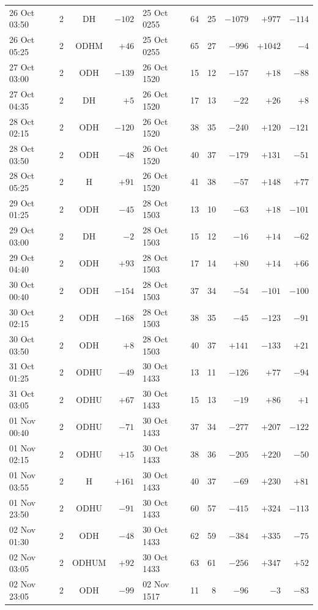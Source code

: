 \begin{tabular}{llcrlrrrrr}
26 Oct 03:50 & 2 & DH & $-102$ & 25 Oct 0255 & 64 & 25 & $-1079$ & $+977$ & $-114$ \\
26 Oct 05:25 & 2 & ODHM & $+46$ & 25 Oct 0255 & 65 & 27 & $-996$ & $+1042$ & $-4$ \\
27 Oct 03:00 & 2 & ODH & $-139$ & 26 Oct 1520 & 15 & 12 & $-157$ & $+18$ & $-88$ \\
27 Oct 04:35 & 2 & DH & $+5$ & 26 Oct 1520 & 17 & 13 & $-22$ & $+26$ & $+8$ \\
28 Oct 02:15 & 2 & ODH & $-120$ & 26 Oct 1520 & 38 & 35 & $-240$ & $+120$ & $-121$ \\
28 Oct 03:50 & 2 & ODH & $-48$ & 26 Oct 1520 & 40 & 37 & $-179$ & $+131$ & $-51$ \\
28 Oct 05:25 & 2 & H & $+91$ & 26 Oct 1520 & 41 & 38 & $-57$ & $+148$ & $+77$ \\
29 Oct 01:25 & 2 & ODH & $-45$ & 28 Oct 1503 & 13 & 10 & $-63$ & $+18$ & $-101$ \\
29 Oct 03:00 & 2 & DH & $-2$ & 28 Oct 1503 & 15 & 12 & $-16$ & $+14$ & $-62$ \\
29 Oct 04:40 & 2 & ODH & $+93$ & 28 Oct 1503 & 17 & 14 & $+80$ & $+14$ & $+66$ \\
30 Oct 00:40 & 2 & ODH & $-154$ & 28 Oct 1503 & 37 & 34 & $-54$ & $-101$ & $-100$ \\
30 Oct 02:15 & 2 & ODH & $-168$ & 28 Oct 1503 & 38 & 35 & $-45$ & $-123$ & $-91$ \\
30 Oct 03:50 & 2 & ODH & $+8$ & 28 Oct 1503 & 40 & 37 & $+141$ & $-133$ & $+21$ \\
31 Oct 01:25 & 2 & ODHU & $-49$ & 30 Oct 1433 & 13 & 11 & $-126$ & $+77$ & $-94$ \\
31 Oct 03:05 & 2 & ODHU & $+67$ & 30 Oct 1433 & 15 & 13 & $-19$ & $+86$ & $+1$ \\
01 Nov 00:40 & 2 & ODHU & $-71$ & 30 Oct 1433 & 37 & 34 & $-277$ & $+207$ & $-122$ \\
01 Nov 02:15 & 2 & ODHU & $+15$ & 30 Oct 1433 & 38 & 36 & $-205$ & $+220$ & $-50$ \\
01 Nov 03:55 & 2 & H & $+161$ & 30 Oct 1433 & 40 & 37 & $-69$ & $+230$ & $+81$ \\
01 Nov 23:50 & 2 & ODHU & $-91$ & 30 Oct 1433 & 60 & 57 & $-415$ & $+324$ & $-113$ \\
02 Nov 01:30 & 2 & ODH & $-48$ & 30 Oct 1433 & 62 & 59 & $-384$ & $+335$ & $-75$ \\
02 Nov 03:05 & 2 & ODHUM & $+92$ & 30 Oct 1433 & 63 & 61 & $-256$ & $+347$ & $+52$ \\
02 Nov 23:05 & 2 & ODH & $-99$ & 02 Nov 1517 & 11 & 8 & $-96$ & $-3$ & $-83$ \\

\end{tabular}
